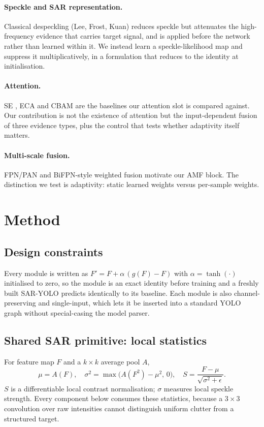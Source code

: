 \documentclass[10pt,twocolumn,letterpaper]{article}
\newcommand{\ours}{\textsc{SAR-YOLO}}
\begin{document}
\paragraph{Speckle and SAR representation.}
Classical despeckling (Lee, Frost, Kuan) reduces speckle but attenuates the
high-frequency evidence that carries target signal, and is applied before the
network rather than learned within it. We instead learn a speckle-likelihood map
and suppress it multiplicatively, in a formulation that reduces to the identity
at initialisation.

\paragraph{Attention.}
SE \cite{se}, ECA \cite{eca} and CBAM \cite{cbam} are the baselines our attention
slot is compared against. Our contribution is not the existence of attention but
the input-dependent fusion of three evidence types, plus the control that tests
whether adaptivity itself matters.

\paragraph{Multi-scale fusion.}
FPN/PAN \cite{fpn} and BiFPN-style weighted fusion motivate our AMF block. The
distinction we test is adaptivity: static learned weights versus per-sample
weights.

\section{Method}
\label{sec:method}

\subsection{Design constraints}
Every module is written as $F' = F + \alpha\,(g(F) - F)$ with
$\alpha = \tanh(\cdot)$ initialised to zero, so the module is an exact identity
before training and a freshly built \ours{} predicts identically to its baseline.
Each module is also channel-preserving and single-input, which lets it be
inserted into a standard YOLO graph without special-casing the model parser.

\subsection{Shared SAR primitive: local statistics}
For feature map $F$ and a $k\times k$ average pool $A$,
\begin{equation}
\mu = A(F),\quad
\sigma^2 = \max\!\big(A(F^2) - \mu^2,\,0\big),\quad
S = \frac{F-\mu}{\sqrt{\sigma^2+\epsilon}}.
\end{equation}
$S$ is a differentiable local contrast normalisation; $\sigma$ measures local
speckle strength. Every component below consumes these statistics, because a
$3\times3$ convolution over raw intensities cannot distinguish uniform clutter
from a structured target.
\end{document}
